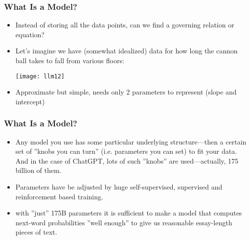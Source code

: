 \begin{frame}[fragile]\frametitle{What Is a Model?}

\begin{itemize}
\item Instead of storing all the data points, can we find a governing relation or equation?
\item Let’s imagine we have (somewhat idealized) data for how long the cannon ball takes to fall from various floors:

\begin{center}
\texttt{[image: llm12]}
\end{center}

\item Approximate but simple, needs only 2 parameters to represent (slope and intercept)

\end{itemize}

\end{frame}

\begin{frame}[fragile]\frametitle{What Is a Model?}

\begin{itemize}
\item Any model you use has some particular underlying structure—then a certain set of ''knobs you can turn'' (i.e. parameters you can set) to fit your data. And in the case of ChatGPT, lots of such ''knobs'' are used—actually, 175 billion of them.
\item Parameters have be adjusted by huge self-supervised, supervised and reinforcement based training.
\item with ''just'' 175B  parameters it is sufficient to make a model that computes next-word probabilities ''well enough'' to give us reasonable essay-length pieces of text.
\end{itemize}

\end{frame}

